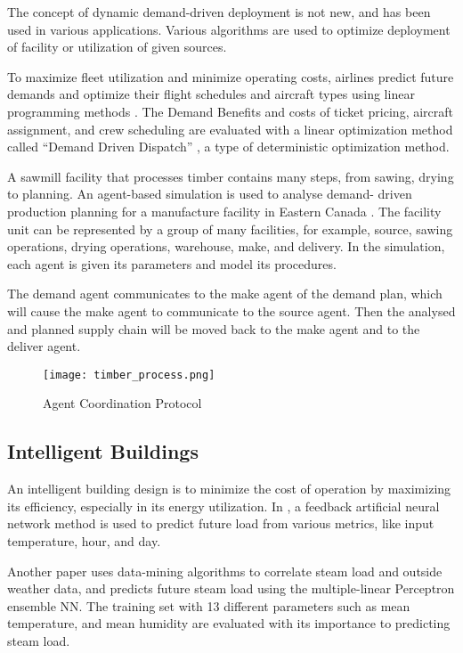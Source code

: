 The concept of dynamic demand-driven deployment is not new,
and has been used in various applications. Various algorithms
are used to optimize deployment of facility or utilization
of given sources.

To maximize fleet utilization and minimize
operating costs, airlines predict future demands
and optimize their flight schedules and aircraft
types using linear programming methods \cite{berge_demand_1993}. The Demand
Benefits and costs of ticket pricing, aircraft assignment, and crew 
scheduling are evaluated with a linear optimization method called
 ``Demand Driven Dispatch'' \cite{shebalov_practical_2009}, a type
of deterministic optimization method.

A sawmill facility that processes timber contains 
many steps, from sawing, drying to planning. An
agent-based simulation is used to analyse demand-
driven production planning for a manufacture facility
in Eastern Canada \cite{yanez_agent-based_2009}.
The facility unit can be represented by a group of many facilities,
for example, source, sawing operations, drying operations, warehouse,
make, and delivery. In the simulation, each agent is given its parameters
and model its procedures.

The demand agent communicates to the make agent of the demand plan,
which will cause the make agent to communicate to the source agent. Then the
analysed and planned supply chain will be moved back to the make agent and
to the deliver agent.

\begin{figure}
	\texttt{[image: timber\_process.png]}
	\caption{Agent Coordination Protocol \cite{yanez_agent-based_2009} } 
	\label{fig:timber_process}
\end{figure}


\subsection{Intelligent Buildings}
An intelligent building design is to minimize 
the cost of operation by maximizing its efficiency,
especially in its energy utilization. In 
\cite{gonzalez_detailed_2002}, a feedback artificial neural
network method is used to predict future load from various
metrics, like input temperature, hour, and day.

Another paper \cite{kusiak_data-driven_2010} uses data-mining algorithms
to correlate steam load and outside weather data, and predicts
future steam load using the multiple-linear Perceptron ensemble
NN. The training set with 13 different parameters such as mean temperature,
and mean humidity are evaluated with its importance to predicting steam load.

